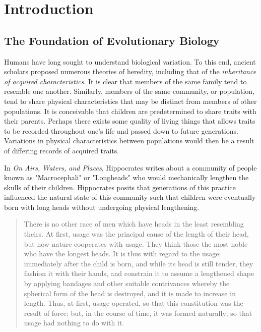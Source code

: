\chapter{Introduction}
\section{The Foundation of Evolutionary Biology}
Humans have long sought to understand biological variation. To this end, ancient scholars proposed numerous theories of heredity, including that of the \textit{inheritance of acquired characteristics}. It is clear that members of the same family tend to resemble one another. Similarly, members of the same community, or population, tend to share physical characteristics that may be distinct from members of other populations. It is conceivable that children are predetermined to share traits with their parents. Perhaps there exists some quality of living things that allows traits to be recorded throughout one's life and passed down to future generations. Variations in physical characteristics between populations would then be a result of differing records of acquired traits.   

In \textit{On Airs, Waters, and Places}, Hippocrates writes about a community of people known as "Macrocephali" or "Longheads" who would mechanically lengthen the skulls of their children. Hippocrates posits that generations of this practice influenced the natural state of this community such that children were eventually born with long heads without undergoing physical lengthening. 
\begin{quote}
    There is no other race of men which have heads in the least resembling theirs. At first, usage was the principal cause of the length of their head, but now nature cooperates with usage. They think those the most noble who have the longest heads. It is thus with regard to the usage: immediately after the child is born, and while its head is still tender, they fashion it with their hands, and constrain it to assume a lengthened shape by applying bandages and other suitable contrivances whereby the spherical form of the head is destroyed, and it is made to increase in length. Thus, at first, usage operated, so that this constitution was the result of force: but, in the course of time, it was formed naturally; so that usage had nothing to do with it. \cite{hippocrates_airs_waters_places}
\end{quote} 

